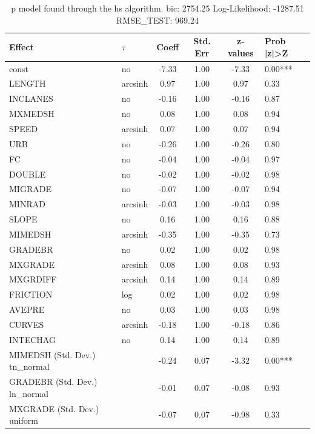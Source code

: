\begin{table}
	\caption{p model found through the hs algorithm. bic: 2754.25 Log-Likelihood: -1287.51 RMSE_TEST: 969.24}
	\begin{center}
		\begin{tabular}{|l|l|c|c|c|l|}
			\hline
			Effect & $\tau$ & Coeff & Std. Err & z-values & Prob |z|>Z \\
			\hline
			const & no & -7.33 & 1.00 & -7.33 & 0.00*** \\
			\hline
			LENGTH & arcsinh & 0.97 & 1.00 & 0.97 & 0.33 \\
			\hline
			INCLANES & no & -0.16 & 1.00 & -0.16 & 0.87 \\
			\hline
			MXMEDSH & no & 0.08 & 1.00 & 0.08 & 0.94 \\
			\hline
			SPEED & arcsinh & 0.07 & 1.00 & 0.07 & 0.94 \\
			\hline
			URB & no & -0.26 & 1.00 & -0.26 & 0.80 \\
			\hline
			FC & no & -0.04 & 1.00 & -0.04 & 0.97 \\
			\hline
			DOUBLE & no & -0.02 & 1.00 & -0.02 & 0.98 \\
			\hline
			MIGRADE & no & -0.07 & 1.00 & -0.07 & 0.94 \\
			\hline
			MINRAD & arcsinh & -0.03 & 1.00 & -0.03 & 0.98 \\
			\hline
			SLOPE & no & 0.16 & 1.00 & 0.16 & 0.88 \\
			\hline
			MIMEDSH & arcsinh & -0.35 & 1.00 & -0.35 & 0.73 \\
			\hline
			GRADEBR & no & 0.02 & 1.00 & 0.02 & 0.98 \\
			\hline
			MXGRADE & arcsinh & 0.08 & 1.00 & 0.08 & 0.93 \\
			\hline
			MXGRDIFF & arcsinh & 0.14 & 1.00 & 0.14 & 0.89 \\
			\hline
			FRICTION & log & 0.02 & 1.00 & 0.02 & 0.98 \\
			\hline
			AVEPRE & no & 0.03 & 1.00 & 0.03 & 0.98 \\
			\hline
			CURVES & arcsinh & -0.18 & 1.00 & -0.18 & 0.86 \\
			\hline
			INTECHAG & no & 0.14 & 1.00 & 0.14 & 0.89 \\
			\hline
			MIMEDSH (Std. Dev.) tn_normal &  & -0.24 & 0.07 & -3.32 & 0.00*** \\
			\hline
			GRADEBR (Std. Dev.) ln_normal &  & -0.01 & 0.07 & -0.08 & 0.93 \\
			\hline
			MXGRADE (Std. Dev.) uniform &  & -0.07 & 0.07 & -0.98 & 0.33 \\

\end{tabular}
\end{center}
\end{table}
